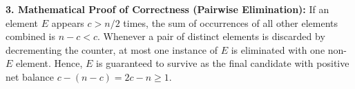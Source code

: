 \documentclass[12pt]{article}
\begin{document}
\textbf{3. Mathematical Proof of Correctness (Pairwise Elimination):}
If an element $E$ appears $c > n/2$ times, the sum of occurrences of all other elements combined is $n - c < c$. Whenever a pair of distinct elements is discarded by decrementing the counter, at most one instance of $E$ is eliminated with one non-$E$ element. Hence, $E$ is guaranteed to survive as the final candidate with positive net balance $c - (n - c) = 2c - n \ge 1$.
\end{document}
